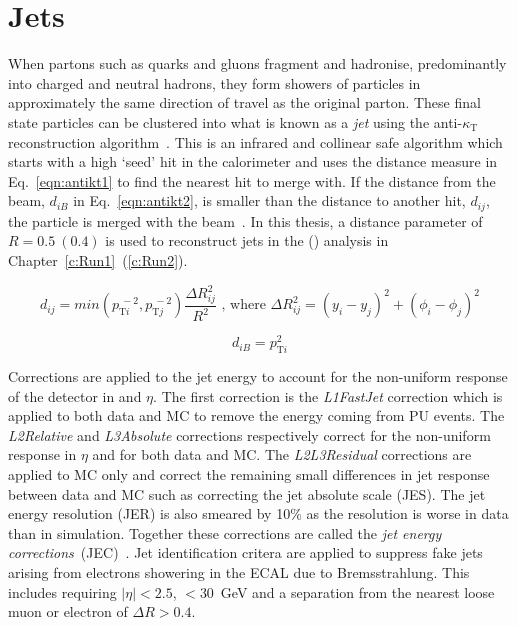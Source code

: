 \section{Jets \label{sec:jetreco}}
When partons such as quarks and gluons fragment and hadronise, predominantly into charged and neutral hadrons, they form showers of particles in approximately the same direction of travel as the original parton. These final state particles can be clustered into what is known as a \emph{jet} using the anti-$\kappa_{\textrm{T}}$ reconstruction algorithm~\cite{Cacciari:2008gp}. This is an infrared and collinear safe algorithm which starts with a high \pt `seed' hit in the calorimeter and uses the distance measure in Eq.~\ref{eqn:antikt1} to find the nearest hit to merge with. If the distance from the beam, $d_{iB}$ in Eq.~\ref{eqn:antikt2}, is smaller than the distance to another hit, $d_{ij}$, the particle is merged with the beam~\cite{Salam2010}. In this thesis, a distance parameter of $R = 0.5~\left(0.4\right)$ is used to reconstruct jets in the \runone (\runtwo) analysis in Chapter~\ref{c:Run1}~(\ref{c:Run2}). 


\begin{equation}
d_{ij}=min\left( p_{\textrm{T}i}^{~-2},p_{\textrm{T}j}^{~-2} \right) \frac{\Delta R_{ij}^{2}}{R^{2}} \textrm{ , where } \Delta R_{ij}^{2} = {\left( y_{i} - y_{j}\right)}^{2} +  {\left( {\phi}_{i} - {\phi}_{j}\right)}^{2}
\label{eqn:antikt1}
\end{equation}

\begin{equation}
d_{iB}=p_{\textrm{T}i}^{2}
\label{eqn:antikt2}
\end{equation}

Corrections are applied to the jet energy to account for the non-uniform response of the detector in \pt and $\eta$. The first correction is the \emph{L1FastJet} correction which is applied to both data and MC to remove the energy coming from PU events. The \emph{L2Relative} and \emph{L3Absolute} corrections respectively correct for the non-uniform response in $\eta$ and \pt for both data and MC. The \emph{L2L3Residual} corrections are applied to MC only and correct the remaining small differences in jet response between data and MC such as correcting the jet absolute scale (JES). The jet energy resolution (JER) is also smeared by 10$\%$ as the resolution is worse in data than in simulation. Together these corrections are called the \emph{jet energy corrections}~(JEC)~\cite{Khachatryan:2016kdb}.
Jet identification critera are applied to suppress fake jets arising from electrons showering in the ECAL due to Bremsstrahlung. This includes requiring $|\eta|<2.5$, \pt$<30$~GeV and a separation from the nearest loose muon or electron of $\Delta R>0.4$.

